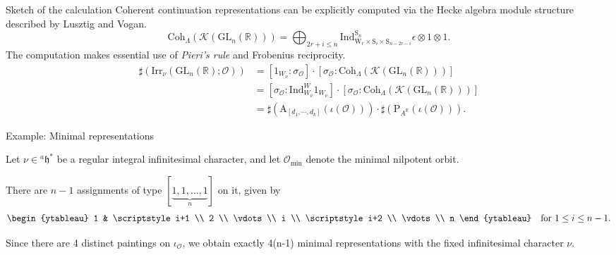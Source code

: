 \documentclass[fleqn,xcolor=dvipsnames]{beamer}
\newcommand{\BR}{{\mathbb {R}}}
\newcommand{\CK}{{\mathcal {K}}}
\newcommand{\CO}{{\mathcal {O}}}
\newcommand{\RA}{{\mathrm {A}}}
\newcommand{\GL}{{\mathrm{GL}}}
\newcommand{\Ind}{{\mathrm{Ind}}}
\newcommand{\Irr}{{\mathrm{Irr}}}
\begin{document}
\begin{frame}{Sketch of the calculation}
  Coherent continuation representations can be explicitly computed via the Hecke algebra module structure described by Lusztig and Vogan.
  \begin{equation*}
    \mathrm{Coh}_{\Lambda}(\CK(\GL_{n}(\BR))) = \bigoplus_{2r + i \leq n} \Ind _{\mathrm{W}_{r} \times \mathrm{S}_{i} \times \mathrm{S}_{n-2r-i}}^{\mathrm{S}_{n}} \epsilon \otimes 1 \otimes 1.
  \end{equation*}
  \pause The computation makes essential use of \alert{\emph{Pieri's rule}} and Frobenius reciprocity.
  \begin{align*}
    \sharp(\Irr_\nu(\GL_{n}(\BR);\CO)) &= [1_{W_\nu}:\sigma_{\CO}] \cdot [\sigma_{\CO}:\mathrm{Coh}_{\Lambda}(\CK(\GL_{n}(\BR)))]\\
    &= [\sigma_{\CO}:\Ind_{W_{\nu}}^{W}1_{W_{\nu}}] \cdot [\sigma_{\CO}:\mathrm{Coh}_{\Lambda}(\CK(\GL_{n}(\BR)))]\\
    & =  \sharp\left(\RA_{[d_1,\cdots,d_k]}(\iota(\CO))\right) \cdot \sharp\left(\mathrm{P}_{A^{\BR}}(\iota(\CO))\right).
  \end{align*}
\end{frame}






\begin{frame}{Example: Minimal representations}

Let \( \nu \in {^a\mathfrak{h}}^* \) be a regular integral infinitesimal character, and let \( \mathcal{O}_{\mathrm{min}} \) denote the \alert{minimal nilpotent orbit}.

\medskip

There are \( n-1 \) assignments of type \( [\underbrace{1, 1, \dots, 1}_n] \) on it, given by
\[
\begin{ytableau}
    1 & \scriptstyle i+1 \\
    2 \\
    \vdots \\
    i \\
    \scriptstyle i+2 \\
    \vdots \\
    n
\end{ytableau}
\quad \text{for } 1 \leq i \leq n-1.
\]

\medskip

\pause Since there are 4 distinct paintings on $\iota_{\CO}$, we obtain exactly \alert{4(n-1) minimal representations}   with the fixed infinitesimal character \( \nu \).

\end{frame}
\end{document}
